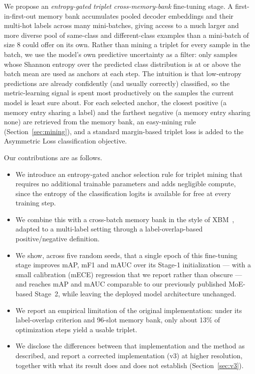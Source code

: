 \documentclass[conference]{IEEEtran}
\begin{document}
We propose an \emph{entropy-gated triplet cross-memory-bank} fine-tuning stage. A first-in-first-out memory bank accumulates pooled decoder embeddings and their multi-hot labels across many mini-batches, giving access to a much larger and more diverse pool of same-class and different-class examples than a mini-batch of size 8 could offer on its own. Rather than mining a triplet for every sample in the batch, we use the model's own predictive uncertainty as a filter: only samples whose Shannon entropy over the predicted class distribution is at or above the batch mean are used as anchors at each step. The intuition is that low-entropy predictions are already confidently (and usually correctly) classified, so the metric-learning signal is spent most productively on the samples the current model is least sure about. For each selected anchor, the closest positive (a memory entry sharing a label) and the farthest negative (a memory entry sharing none) are retrieved from the memory bank, an easy-mining rule (Section~\ref{sec:mining}), and a standard margin-based triplet loss is added to the Asymmetric Loss classification objective.

Our contributions are as follows.
\begin{itemize}
\item We introduce an entropy-gated anchor selection rule for triplet mining that requires no additional trainable parameters and adds negligible compute, since the entropy of the classification logits is available for free at every training step.
\item We combine this with a cross-batch memory bank in the style of XBM~\cite{b6}, adapted to a multi-label setting through a label-overlap-based positive/negative definition.
\item We show, across five random seeds, that a single epoch of this fine-tuning stage improves mAP, mF1 and mAUC over its Stage-1 initialization --- with a small calibration (mECE) regression that we report rather than obscure --- and reaches mAP and mAUC comparable to our previously published MoE-based Stage~2, while leaving the deployed model architecture unchanged.
\item We report an empirical limitation of the original implementation: under its label-overlap criterion and 96-slot memory bank, only about 13\% of optimization steps yield a usable triplet.
\item We disclose the differences between that implementation and the method as described, and report a corrected implementation (v3) at higher resolution, together with what its result does and does not establish (Section~\ref{sec:v3}).
\end{itemize}
\end{document}
